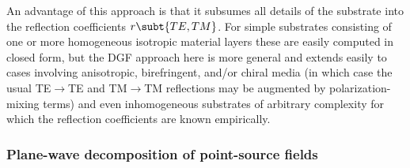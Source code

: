 \documentclass[letterpaper]{article}
\begin{document}
An advantage of this approach is that it subsumes all details
of the substrate into the reflection coefficients $r\subt{TE,TM}$.
For simple substrates consisting of one or more homogeneous
isotropic material layers these are easily computed in closed
form, but the DGF approach here is more general and extends
easily to cases involving anisotropic, birefringent, and/or
chiral media (in which case the usual TE$\to$TE and TM$\to$TM
reflections may be augmented by polarization-mixing terms) and 
even inhomogeneous substrates of arbitrary complexity for which
the reflection coefficients are known empirically.

\subsubsection{Plane-wave decomposition of point-source fields}
\end{document}
